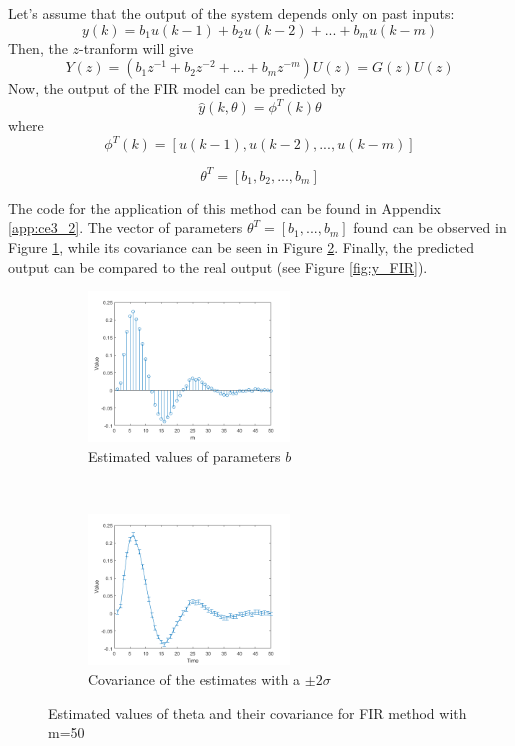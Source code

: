 \documentclass[a4paper,11pt]{article}
\begin{document}
Let's assume that the output of the system depends only on past inputs:
\begin{equation}
y(k) = b_1u(k-1) + b_2u(k-2) + ... + b_mu(k-m)
\end{equation}
Then, the $z$-tranform will give
\begin{equation}
Y(z)=(b_1z^{-1} + b_2z^{-2} + ... + b_mz^{-m})U(z) = G(z)U(z)
\end{equation}
Now, the output of the FIR model can be predicted by
\begin{equation}
\hat{y}(k,\theta) = \phi^T(k)\theta
\end{equation}
where
\begin{equation}
\phi^T(k)=[u(k-1),u(k-2),...,u(k-m)] 
\end{equation}

\begin{equation}
\theta^T = [b_1,b_2,...,b_m]
\end{equation}

The code for the application of this method can be found in Appendix \ref{app:ce3_2}. The vector of parameters $\theta^T = [b_1,...,b_m]$ found can be observed in Figure \ref{fig:est_theta_FIR}, while its covariance can be seen in Figure \ref{fig:cov_FIR}.
Finally, the predicted output can be compared to the real output (see Figure \ref{fig:y_FIR}).



\begin{figure}[H]
\centering
\begin{subfigure}[t]{0.4\textwidth}
\centering
\includegraphics[height = 4cm]{images/theta_FIR}
\caption{Estimated values of parameters $b$}
\label{fig:est_theta_FIR}
\end{subfigure}
~
\begin{subfigure}[t]{0.4\textwidth}
\centering
\includegraphics[height = 4cm]{images/cov_FIR}
\caption{Covariance of the estimates with a $\pm2\sigma$}
\label{fig:cov_FIR}
\end{subfigure}
\caption{Estimated values of theta and their covariance for FIR method with m=50}
\label{fig:theta_FIR}
\end{figure}
\end{document}
